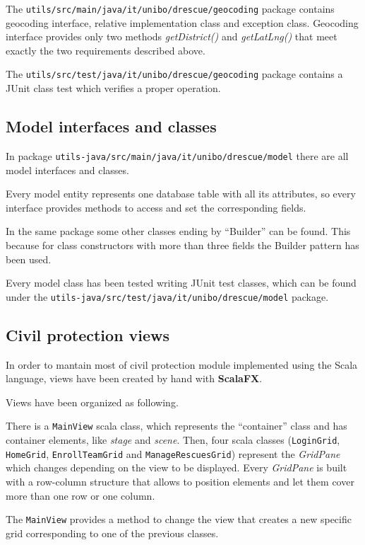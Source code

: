 \documentclass[a4paper,12pt]{report}
\begin{document}
The \texttt{utils/src/main/java/it/unibo/drescue/geocoding} package contains geocoding interface, relative implementation class and exception class. Geocoding interface provides only two methods \emph{getDistrict()} and \emph{getLatLng()} that meet exactly the two requirements described above.

The \texttt{utils/src/test/java/it/unibo/drescue/geocoding} package contains a JUnit class test which verifies a proper operation.

\subsection{Model interfaces and classes}
In package \texttt{utils-java/src/main/java/it/unibo/drescue/model} there are all model interfaces and classes.

Every model entity represents one database table with all its attributes, so every interface provides methods to access and set the corresponding fields.

In the same package some other classes ending by ``Builder'' can be found. This because for class constructors with more than three fields the Builder pattern has been used.

Every model class has been tested writing JUnit test classes, which can be found under the \texttt{utils-java/src/test/java/it/unibo/drescue/model} package.

\subsection{Civil protection views}
In order to mantain most of civil protection module implemented using the Scala language, views have been created by hand with \textbf{ScalaFX}. 

Views have been organized as following.

There is a \texttt{MainView} scala class, which represents the ``container'' class and has container elements, like \textit{stage} and \textit{scene}.
Then, four scala classes (\texttt{LoginGrid}, \texttt{HomeGrid}, \texttt{EnrollTeamGrid} and \texttt{ManageRescuesGrid}) represent the \textit{GridPane} which changes depending on the view to be displayed.
Every \textit{GridPane} is built with a row-column structure that allows to position elements and let them cover more than one row or one column.

The \texttt{MainView} provides a method to change the view that creates a new specific grid corresponding to one of the previous classes.
\end{document}
